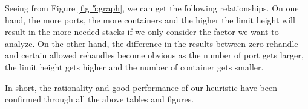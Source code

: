 \documentclass[review,3p,times,authoryear,12pt]{elsarticle}
\begin{document}

Seeing from Figure \ref{fig 5:graph}, we can get the following relationships.
On one hand, the more ports, the more containers and the higher the limit height will result in the more needed stacks if we only consider the factor we want to analyze.
On the other hand, the difference in the results between zero rehandle and certain allowed rehandles become obvious as the number of port gets larger, the limit height  gets higher and the number of container gets smaller.

In short, the rationality and good performance of our heuristic have been confirmed through all the above tables and figures.
\end{document}
